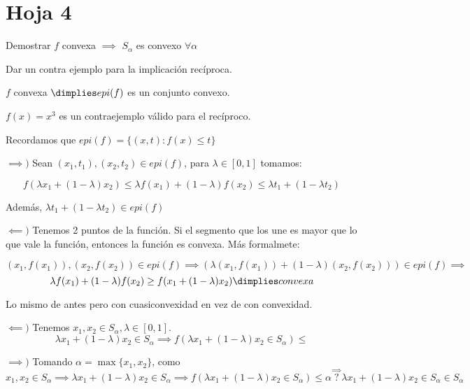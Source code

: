 \section{Hoja 4}


\begin{problem}[1]

\ppart
Demostrar $f$ convexa $\implies$ $S_{\alpha}$ es convexo $\forall \alpha$

Dar un contra ejemplo para la implicación recíproca.

\ppart $f$ convexa $\dimplies epi(f)$ es un conjunto convexo.

\solution

\spart $f(x) = x^3$  es un contraejemplo válido para el recíproco.

\spart Recordamos que $epi(f) = \{(x,t) : f(x) \leq t\}$

$\implies)$ Sean $(x_1,t_1),(x_2,t_2)\in epi(f)$, para $\lambda \in [0,1]$ tomamos:

\[
 f(\lambda x_1 + (1-\lambda) x_2) \leq \lambda f(x_1) + (1-\lambda) f(x_2) \leq \lambda t_1 + (1-\lambda t_2)
 \]

Además, $\lambda t_1 + (1-\lambda t_2) \in epi(f)$


$\impliedby)$ Tenemos 2 puntos de la función. Si el segmento que los une es mayor que lo que vale la función, entonces la función es convexa. Más formalmete:

\[
    (x_1,f(x_1)),(x_2,f(x_2)) \in epi(f) \implies \left(\lambda (x_1,f(x_1)) + (1-\lambda) (x_2,f(x_2))\right) \in epi(f) \implies\]
    \[ \lambda f(x_1) + (1-\lambda) f(x_2) \geq f(x_1 + (1-\lambda) x_2) \dimplies convexa
\]


\end{problem}

\begin{problem}[2]
Lo mismo de antes pero con cuasiconvexidad en vez de con convexidad.

\solution

$\impliedby)$ Tenemos $x_1,x_2 \in S_{\alpha},\lambda \in [0,1]$.
\[
    \lambda x_1 + (1-\lambda) x_2 \in S_{\alpha} \implies f(\lambda x_1 + (1-\lambda) x_2 \in S_{\alpha}) \leq
\]


$\implies)$ Tomando $\alpha=  \max\{x_1,x_2\}$, como
\[x_1,x_2 \in S_{\alpha} \implies \lambda x_1 + (1-\lambda) x_2 \in S_{\alpha} \implies f(\lambda x_1 + (1-\lambda) x_2 \in S_{\alpha}) \leq \alpha \overset{\implies}{?} \lambda x_1 + (1-\lambda) x_2 \in S_{\alpha} \in S_{\alpha}\]
\end{problem}

